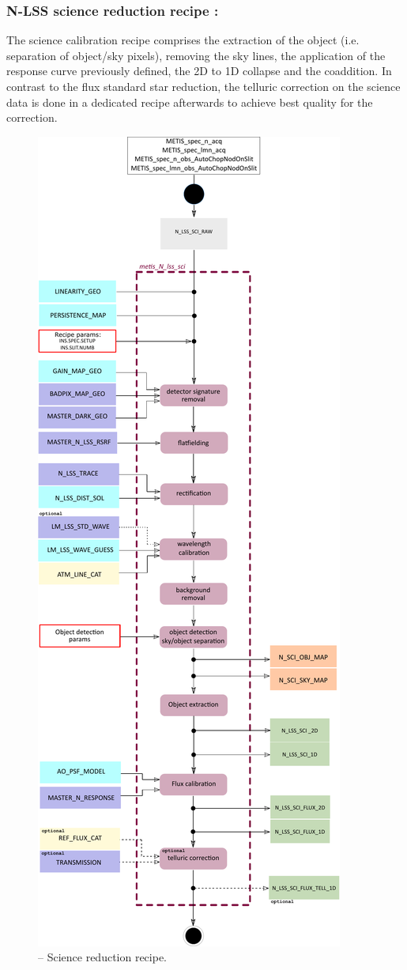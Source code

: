 \subsubsection{N-LSS science reduction recipe :}\label{rec:metis_n_lss_sci}
The science calibration recipe comprises the extraction of the object (i.e. separation of object/sky pixels), removing the sky lines, the application of the response curve previously defined, the 2D to 1D collapse and the coaddition. In contrast to the flux standard star reduction, the telluric correction on the science data is done in a dedicated recipe afterwards to achieve best quality for the correction.
\begin{figure}[ht]
  \centering
  \includegraphics[width=0.35\textheight]{figures/metis_N_lss_sci_v0.83.pdf}
  \caption[Recipe: ]{ --
    Science reduction recipe.}
  \label{Fig:rec_N_lss_sci}
\end{figure}
